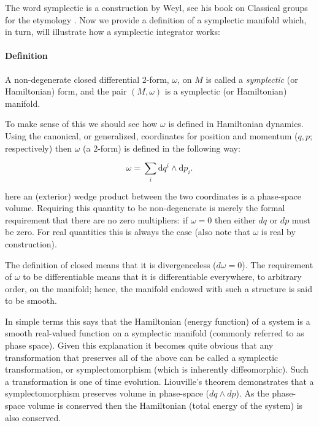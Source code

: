 The word symplectic is a construction by Weyl, see his book on Classical groups for the etymology \citep{bib_weyl2}. Now we provide a definition of a symplectic manifold which, in turn, will illustrate how a symplectic integrator works:

\paragraph{Definition} A non-degenerate closed differential 2-form, $\omega$, on $M$ is called a {\it symplectic} (or Hamiltonian) form, and the pair $(M, \omega)$ is a symplectic (or Hamiltonian) manifold. \citep{bib_tens}

To make sense of this we should see how $\omega$ is defined in Hamiltonian dynamics. Using the canonical, or generalized, coordinates for position and momentum ($q, p$; respectively) then $\omega$ (a 2-form) is defined in the following way:

\begin{equation}
\omega =\sum_i \mathrm{d}q^i \wedge \mathrm{d}p_i.
\end{equation}

\noindent here an (exterior) wedge product between the two coordinates is a phase-space volume. Requiring this quantity to be non-degenerate is  merely the formal requirement that there are no zero multipliers: if $\omega = 0$ then either $dq$ or $dp$ must be zero. For real quantities this is always the case (also note that $\omega$ is real by construction).

The definition of closed means that it is divergenceless ($d \omega = 0$). The requirement of $\omega$ to be differentiable means that it is differentiable everywhere, to arbitrary order, on the manifold; hence, the manifold endowed with such a structure is said to be smooth. \citep{bib_tens}

In simple terms this says that the Hamiltonian (energy function) of a system is a smooth real-valued function on a symplectic manifold (commonly referred to as phase space). Given this explanation it becomes quite obvious that any transformation that preserves all of the above can be called a symplectic transformation, or symplectomorphism (which is inherently diffeomorphic). Such a transformation is one of time evolution. Liouville's theorem demonstrates that a symplectomorphism preserves volume in phase-space ($dq \wedge dp$). As the phase-space volume is conserved then the Hamiltonian (total energy of the system) is also conserved.

